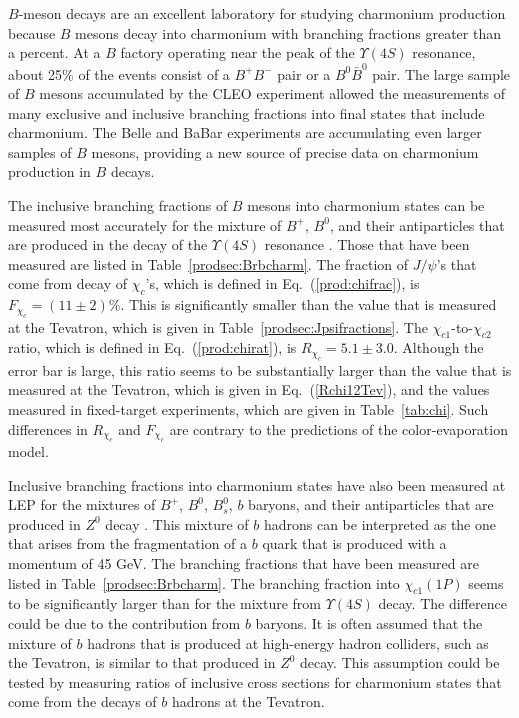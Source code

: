 $B$-meson decays are an excellent laboratory for studying 
charmonium production because $B$ mesons decay into 
charmonium with branching fractions greater than a percent.  
At a $B$ factory operating near the peak of the $\Upsilon(4S)$ 
resonance, about 25\% of the events consist of
a $B^+ B^-$ pair or a $B^0 \bar B^0$ pair.  The large sample 
of $B$ mesons accumulated by the CLEO experiment allowed 
the measurements of many exclusive and inclusive branching 
fractions into final states that include charmonium.
The Belle and BaBar experiments are accumulating even larger
samples of $B$ mesons, providing a new source of 
precise data on charmonium production in $B$ decays.

The inclusive branching fractions of $B$ mesons into charmonium states
can be measured most accurately for the mixture of $B^+$, $B^0$, and
their antiparticles that are produced in the decay of the $\Upsilon(4S)$
resonance \cite{Balest:1994jf,Chen:2000ri}. 
Those that have been measured are listed in
Table~\ref{prodsec:Brbcharm}. The fraction of $J/\psi$'s that come from
decay of $\chi_c$'s, which is defined in Eq.~(\ref{prod:chifrac}), is
$F_{\chi_c} = (11 \pm 2)$\%. This is significantly smaller than
the value that is measured at the Tevatron, 
which is given in Table~\ref{prodsec:Jpsifractions}.
The $\chi_{c1}$-to-$\chi_{c2}$ ratio,
which is defined in Eq.~(\ref{prod:chirat}), is $R_{\chi_c} = 5.1\pm 3.0$. 
Although the error bar is large, this ratio seems to be
substantially larger than the value that is measured
at the Tevatron, which is given in Eq.~(\ref{Rchi12Tev}),
and the values measured in fixed-target experiments, 
which are given in Table~\ref{tab:chi}. 
Such differences in $R_{\chi_c}$ and $F_{\chi_c}$
are contrary to the predictions of the color-evaporation model.


Inclusive branching fractions into charmonium states have also been
measured at LEP for the mixtures of $B^+$, $B^0$, $B^0_s$, $b$ baryons,
and their antiparticles that are produced in 
$Z^0$ decay \cite{Buskulic:1992wp,Adriani:1993ta,Abreu:1994rk}. 
This mixture of $b$ hadrons can be interpreted as the one that
arises from the fragmentation of a $b$ quark that is produced with 
a momentum of 45 GeV.
The branching fractions that
have been measured are listed in Table~\ref{prodsec:Brbcharm}. The
branching fraction into $\chi_{c1}(1P)$ seems to be significantly larger
than for the mixture from $\Upsilon(4S)$ decay. The difference could be
due to the contribution from $b$ baryons.
It is often assumed that the mixture of $b$ hadrons that is produced 
at high-energy hadron colliders, such as the Tevatron, 
is similar to that produced in $Z^0$ decay.  This assumption could be 
tested by measuring ratios of inclusive cross sections 
for charmonium states that come from the decays of $b$ 
hadrons at the Tevatron.


